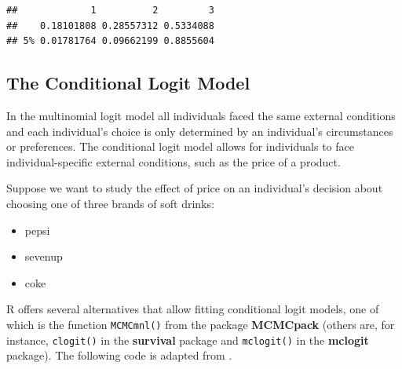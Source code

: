 \documentclass[]{book}
\providecommand{\tightlist}{%
  \setlength{\itemsep}{0pt}\setlength{\parskip}{0pt}}
\begin{document}
\begin{verbatim}
##             1          2         3
##    0.18101808 0.28557312 0.5334088
## 5% 0.01781764 0.09662199 0.8855604
\end{verbatim}

\hypertarget{the-conditional-logit-model}{%
\subsection{The Conditional Logit Model}\label{the-conditional-logit-model}}

In the multinomial logit model all individuals faced the same external conditions and each individual's choice is only determined by an individual's circumstances or preferences. The conditional logit model allows for individuals to face individual-specific external conditions, such as the price of a product.

Suppose we want to study the effect of price on an individual's decision about choosing one of three brands of soft drinks:

\begin{itemize}
\tightlist
\item
  pepsi
\item
  sevenup
\item
  coke
\end{itemize}

R offers several alternatives that allow fitting conditional logit models, one of which is the function \texttt{MCMCmnl()} from the package \textbf{MCMCpack} (others are, for instance, \texttt{clogit()} in the \textbf{survival} package and \texttt{mclogit()} in the \textbf{mclogit} package). The following code is adapted from \citet{Adkins2014}.
\end{document}
